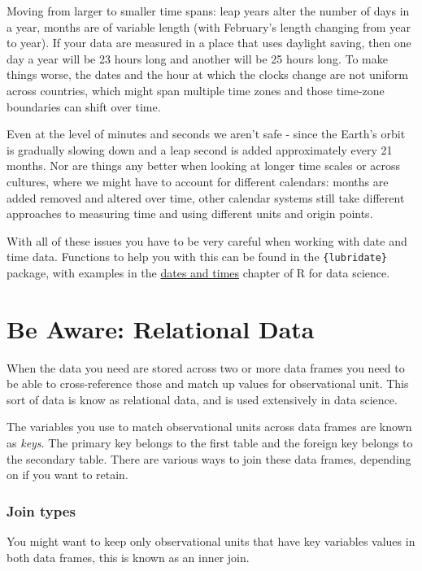 \documentclass[
  letterpaper,
  DIV=11,
  numbers=noendperiod]{scrreprt}
\begin{document}
Moving from larger to smaller time spans: leap years alter the number of
days in a year, months are of variable length (with February's length
changing from year to year). If your data are measured in a place that
uses daylight saving, then one day a year will be 23 hours long and
another will be 25 hours long. To make things worse, the dates and the
hour at which the clocks change are not uniform across countries, which
might span multiple time zones and those time-zone boundaries can shift
over time.

Even at the level of minutes and seconds we aren't safe - since the
Earth's orbit is gradually slowing down and a leap second is added
approximately every 21 months. Nor are things any better when looking at
longer time scales or across cultures, where we might have to account
for different calendars: months are added removed and altered over time,
other calendar systems still take different approaches to measuring time
and using different units and origin points.

With all of these issues you have to be very careful when working with
date and time data. Functions to help you with this can be found in the
\texttt{\{lubridate\}} package, with examples in the
\href{https://r4ds.had.co.nz/dates-and-times.html\#dates-and-times}{dates
and times} chapter of R for data science.

\section{Be Aware: Relational Data}\label{be-aware-relational-data}

When the data you need are stored across two or more data frames you
need to be able to cross-reference those and match up values for
observational unit. This sort of data is know as relational data, and is
used extensively in data science.

The variables you use to match observational units across data frames
are known as \emph{keys}. The primary key belongs to the first table and
the foreign key belongs to the secondary table. There are various ways
to join these data frames, depending on if you want to retain.

\subsubsection{Join types}\label{join-types}

You might want to keep only observational units that have key variables
values in both data frames, this is known as an inner join.
\end{document}
